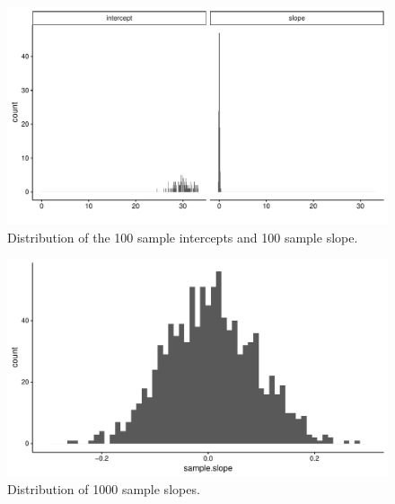 \documentclass[]{book}\usepackage[]{graphicx}\usepackage[]{color}
\makeatletter
\def\maxwidth{ %
  \ifdim\Gin@nat@width>\linewidth
    \linewidth
  \else
    \Gin@nat@width
  \fi
}
\newenvironment{knitrout}{}{} %
\makeatother
\begin{document}
\begin{knitrout}
\color{fgcolor}\begin{figure}

{\centering \includegraphics[width=\maxwidth]{figure/inf_3b-1} 

}

\caption[Distribution of the 100 sample intercepts and 100 sample slope]{Distribution of the 100 sample intercepts and 100 sample slope.}\label{fig:inf_3b}
\end{figure}


\end{knitrout}




\begin{knitrout}
\color{fgcolor}\begin{figure}

{\centering \includegraphics[width=\maxwidth]{figure/inf_5-1} 

}

\caption[Distribution of 1000 sample slopes]{Distribution of 1000 sample slopes.}\label{fig:inf_5}
\end{figure}


\end{knitrout}
\end{document}
